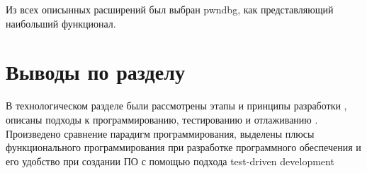 Из всех описынных расширений был выбран pwndbg, как представляющий
наибольший функционал.


\section*{Выводы по разделу}\label{sec:ch1/sec2}
В технологическом разделе были рассмотрены этапы и принципы разработки {\ProgModule}, 
описаны подходы к программированию, тестированию и отлаживанию {\ProgModule}.
Произведено сравнение парадигм программирования, выделены плюсы функционального
программирования при разработке программного обеспечения и его удобство при 
создании ПО с помощью подхода test-driven development
